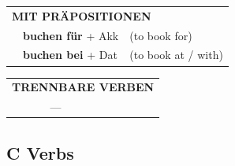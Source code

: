 \documentclass[10pt,a4paper]{revtex4-2}
\begin{document}
\begin{verbbox-acc}
\vspace{10pt}

\begin{tabular}{lll}
\multicolumn{3}{l}{\textbf{MIT PRÄPOSITIONEN}}\\
& \textbf{buchen für} + Akk & (to book for)\\
& \textbf{buchen bei} + Dat & (to book at / with)\\
\end{tabular}
\hfill
\begin{tabular}{lll}
\multicolumn{3}{l}{\textbf{TRENNBARE VERBEN}}\\
& ---\\
\end{tabular}
\vspace{-5pt}
\end{verbbox-acc}

\subsection{C Verbs}
\end{document}
